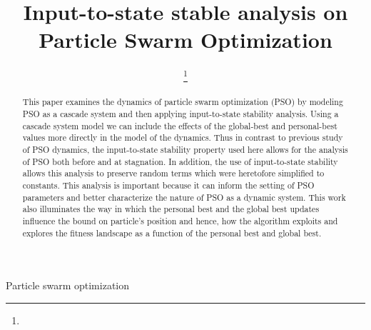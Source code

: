 \documentclass[conference]{IEEEtran}
\begin{document}
\title{Input-to-state stable analysis on Particle Swarm Optimization}

\author{

\thanks{}
}

\markboth{}{}

\maketitle

\begin{abstract}
This paper examines the dynamics of particle swarm optimization (PSO) by modeling PSO as a cascade system and then applying input-to-state stability analysis.
Using a cascade system model we can
include the effects of the global-best and personal-best values more directly in the model of the dynamics.
Thus in contrast to previous study of PSO dynamics, the input-to-state stability property used here allows for the analysis of PSO both before and at stagnation.
In addition, the use of input-to-state stability allows this analysis to preserve random terms which were heretofore simplified to constants.
This analysis is important because it can inform the setting of PSO parameters and better characterize the nature of PSO as a dynamic system.
This work also illuminates the way in which the personal best and the global best updates influence the bound on particle's position and hence, how the algorithm
exploits and explores the fitness landscape as a function of the personal best and global best.
\end{abstract}

\begin{IEEEkeywords}
Particle swarm optimization
\end{IEEEkeywords}

\IEEEpeerreviewmaketitle

















\end{document}
